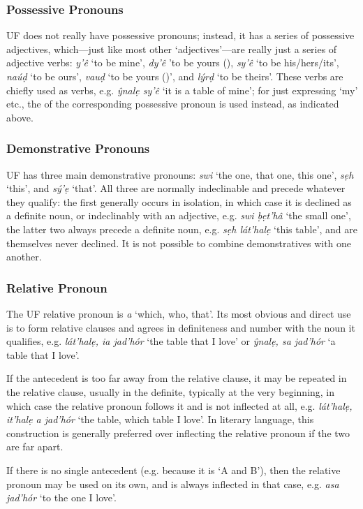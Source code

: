 \documentclass[a4paper, 12pt, twoside, final]{article}
\let \w \textit
\begin{document}
\subsubsection{Possessive Pronouns}
UF does not really have possessive pronouns; instead, it has a series of possessive adjectives, which—just like most other
‘adjectives’—are really just a series of adjective verbs: \w{y’ê} ‘to be mine’, \w{dy’ê} ’to be yours (),
\w{sy’ê} ‘to be his/hers/its’, \w{naúḍ} ‘to be ours’, \w{vauḍ} ‘to be yours ()’, and \w{lýrḍ} ‘to be theirs’. These verbs
are chiefly used as verbs, e.g. \w{ŷnalẹ sy’ê} ‘it is a table of mine’; for just expressing ‘my’ etc., the  of the
corresponding possessive pronoun is used instead, as indicated above.

\subsubsection{Demonstrative Pronouns}
UF has three main demonstrative pronouns: \w{swi} ‘the one, that one, this one’, \w{sẹh} ‘this’, and \w{sý’ẹ} ‘that’. All
three are normally indeclinable and precede whatever they qualify: the first generally occurs in isolation, in which
case it is declined as a definite noun, or indeclinably with an adjective, e.g. \w{swi ḅẹt’hâ} ‘the small one’, the
latter two always precede a definite noun, e.g. \w{sẹh lát’halẹ} ‘this table’, and are themselves never declined. It
is not possible to combine demonstratives with one another.

\subsubsection{Relative Pronoun}
The UF relative pronoun is \w{a} ‘which, who, that’. Its most obvious and direct use is to form relative
clauses and agrees in definiteness and number with the noun it qualifies, e.g. \w{lát’halẹ, ia jad’hór} ‘the
table that I love’ or \w{ŷnalẹ, sa jad’hór} ‘a table that I love’.

If the antecedent is too far away from the relative clause, it may be repeated in the relative clause,
usually in the definite, typically at the very beginning, in which case the relative pronoun follows it and is not inflected at
all, e.g. \w{lát’halẹ, it’halẹ a jad’hór} ‘the table, which table I love’. In literary language, this
construction is generally preferred over inflecting the relative pronoun if the two are far apart.

If there is no single antecedent (e.g. because it is ‘A and B’), then the relative pronoun may be used on
its own, and is always inflected in that case, e.g.  \w{asa jad’hór} ‘to the one I love’.
\end{document}
